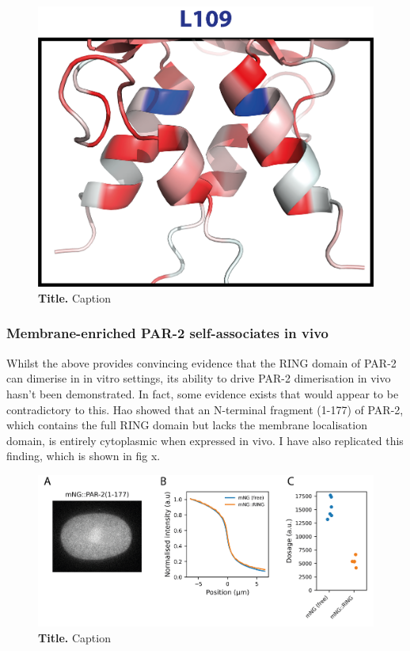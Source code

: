 \documentclass[12pt]{"article"}
\newcommand{\mycaption}[2]{\caption[#1]{\textbf{#1.} #2}}
\begin{document}
\begin{figure}[!h]
\includegraphics[scale=1]{l109_structure}
\setlength{\abovecaptionskip}{20pt}
\centering
\mycaption{Title}{Caption}
\label{fig:l109_structure}
\end{figure}


\clearpage
\subsubsection{Membrane-enriched PAR-2 self-associates in vivo}

Whilst the above provides convincing evidence that the RING domain of PAR-2 can dimerise in in vitro settings, its ability to drive PAR-2 dimerisation in vivo hasn't been demonstrated. In fact, some evidence exists that would appear to be contradictory to this. Hao showed that an N-terminal fragment (1-177) of PAR-2, which contains the full RING domain but lacks the membrane localisation domain, is entirely cytoplasmic when expressed in vivo. I have also replicated this finding, which is shown in fig x.\\

\begin{figure}[!h]
\includegraphics[scale=0.9]{ring_fragment_in_vivo}
\setlength{\abovecaptionskip}{20pt}
\centering
\mycaption{Title}{Caption}
\label{fig:ring_fragment_in_vivo}
\end{figure}
\end{document}
